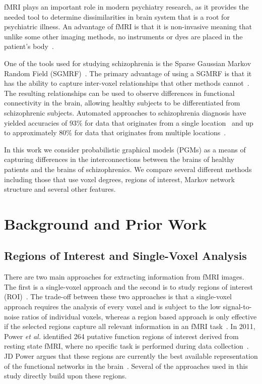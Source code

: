 \documentclass{article} %
\begin{document}
fMRI plays an important role in modern psychiatry research, as it provides the 
needed tool to determine dissimilarities in brain system that is a root for 
psychiatric illness\cite{Zhan_2015}. An advantage of fMRI is that it is 
non-invasive meaning that unlike some other imaging methods, no instruments or 
dyes are placed in the patient’s body~\cite{fmriMatthews, Grinvald_2000}. 

One of the tools used for studying schizophrenia is the
Sparse Gaussian Markov Random Field (SGMRF)~\cite{Rish_2013}\cite{Rosa_2013}. 
The primary advantage of using a SGMRF is that it has the ability to capture
inter-voxel relationships that other methods cannot~\cite{Rish_2013}.
The resulting relationships can be used to observe differences in functional 
connectivity in the brain, allowing healthy subjects to be differentiated from 
schizophrenic subjects. Automated approaches to schizophrenia
diagnosis have yielded accuracies of $93\%$ for data that 
originates from a single location~\cite{Rish_2013} and up to approximately 
$80\%$ for data that originates from multiple locations~\cite{Cheng2015}.

In this work we consider probabilistic graphical models (PGMs) as a means
of capturing differences in the interconnections between the brains of
healthy patients and the brains of schizophrenics. We compare several 
different methods including those that use voxel degrees, regions of 
interest, Markov network structure and several other features. 

\section{Background and Prior Work}

\subsection{Regions of Interest and Single-Voxel Analysis}
There are two main approaches for extracting
information from fMRI images. The first is a single-voxel approach and 
the second is to study regions of interest (ROI)~\cite{heller2006cluster}. 
The trade-off between these two approaches is that a single-voxel approach
requires the analysis of every voxel and is subject to the low signal-to-noise 
ratios of individual voxels, whereas a region based approach is only
effective if the selected regions capture all relevant information in an fMRI 
task~\cite{heller2006cluster}. In 2011, Power \emph{et al.} identified 264 
putative function regions of interest derived from resting state fMRI, where 
no specific task is performed during data collection~\cite{Power_2011}. 
JD Power argues that these regions are currently the best available 
representation of the functional networks in the brain~\cite{Power_2011}. 
Several of the approaches used in this study directly build upon these regions.
\end{document}
